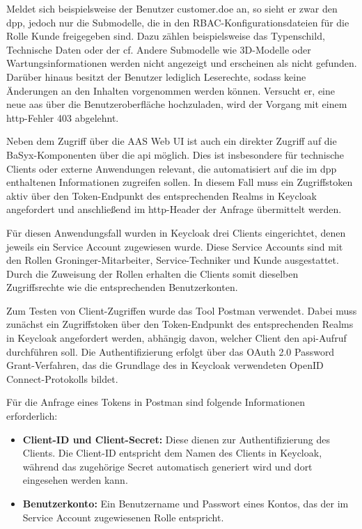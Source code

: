 Meldet sich beispielsweise der Benutzer customer.doe an, so sieht er zwar den \acs{dpp}, jedoch nur die Submodelle, die in den RBAC-Konfigurationsdateien für die Rolle Kunde freigegeben sind. 
Dazu zählen beispielsweise das Typenschild, Technische Daten oder der \acs{cf}. 
Andere Submodelle wie 3D-Modelle oder Wartungsinformationen werden nicht angezeigt und erscheinen als nicht gefunden. 
Darüber hinaus besitzt der Benutzer lediglich Leserechte, sodass keine Änderungen an den Inhalten vorgenommen werden können. 
Versucht er, eine neue \acs{aas} über die Benutzeroberfläche hochzuladen, wird der Vorgang mit einem \acs{http}-Fehler 403 abgelehnt.

Neben dem Zugriff über die AAS Web UI ist auch ein direkter Zugriff auf die BaSyx-Komponenten über die \acs{api} möglich.
Dies ist insbesondere für technische Clients oder externe Anwendungen relevant, die automatisiert auf die im \acs{dpp} enthaltenen Informationen zugreifen sollen.
In diesem Fall muss ein Zugriffstoken aktiv über den Token-Endpunkt des entsprechenden Realms in Keycloak angefordert und anschließend im \acs{http}-Header der Anfrage übermittelt werden.

Für diesen Anwendungsfall wurden in Keycloak drei Clients eingerichtet, denen jeweils ein Service Account zugewiesen wurde.
Diese Service Accounts sind mit den Rollen Groninger-Mitarbeiter, Service-Techniker und Kunde ausgestattet.
Durch die Zuweisung der Rollen erhalten die Clients somit dieselben Zugriffsrechte wie die entsprechenden Benutzerkonten.

Zum Testen von Client-Zugriffen wurde das Tool Postman verwendet.
Dabei muss zunächst ein Zugriffstoken über den Token-Endpunkt des entsprechenden Realms in Keycloak angefordert werden, abhängig davon, welcher Client den \acs{api}-Aufruf durchführen soll.
Die Authentifizierung erfolgt über das OAuth 2.0 Password Grant-Verfahren, das die Grundlage des in Keycloak verwendeten OpenID Connect-Protokolls bildet.

Für die Anfrage eines Tokens in Postman sind folgende Informationen erforderlich:

\begin{itemize}[noitemsep, leftmargin=*]
    \item \textbf{Client-ID und Client-Secret:} Diese dienen zur Authentifizierung des Clients. Die Client-ID entspricht dem Namen des Clients in Keycloak, während das zugehörige Secret automatisch generiert wird und dort eingesehen werden kann.
    \item \textbf{Benutzerkonto:} Ein Benutzername und Passwort eines Kontos, das der im Service Account zugewiesenen Rolle entspricht.
\end{itemize}

